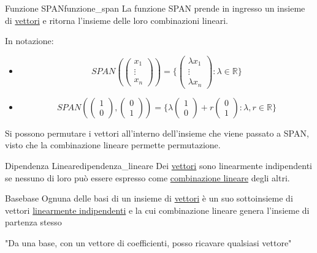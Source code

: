 \documentclass{article}
\begin{document}
\begin{definition}{Funzione SPAN}{funzione_span}
    La funzione SPAN prende in ingresso un insieme di \hyperref[def:vettore]{vettori} e ritorna l'insieme delle loro combinazioni lineari.
    
    In notazione: \begin{itemize}
        \item \[SPAN(\begin{pmatrix}
            x_1 \\
            \vdots \\
            x_n
            \end{pmatrix}) = \{\begin{pmatrix}
            \lambda x_1 \\
            \vdots \\
            \lambda x_n
            \end{pmatrix} : \lambda \in \mathbb{R}\}\]
        \item \[SPAN(\begin{pmatrix}
            1 \\
            0
            \end{pmatrix}, \begin{pmatrix}
            0 \\
            1
            \end{pmatrix}) = \{ \lambda\begin{pmatrix}
            1 \\
            0
            \end{pmatrix} + r\begin{pmatrix}
            0 \\
            1
            \end{pmatrix} : \lambda, r \in \mathbb{R}\}\]
    \end{itemize}

    Si possono permutare i vettori all'interno dell'insieme che viene passato a SPAN, visto che la combinazione lineare permette permutazione.
\end{definition}

\begin{definition}{Dipendenza Lineare}{dipendenza_lineare}
    Dei \hyperref[def:vettore]{vettori} sono linearmente indipendenti se nessuno di loro può essere espresso come \hyperref[def:combinazione_lineare]{combinazione lineare} degli altri.
\end{definition}

\begin{definition}{Base}{base}
    Ognuna delle basi di un insieme di \hyperref[def:vettore]{vettori} è un suo sottoinsieme di vettori \hyperref[def:dipendenza_lineare]{linearmente indipendenti} e la cui combinazione lineare genera l'insieme di partenza stesso

    "Da una base, con un vettore di coefficienti, posso ricavare qualsiasi vettore"
\end{definition}
\end{document}

